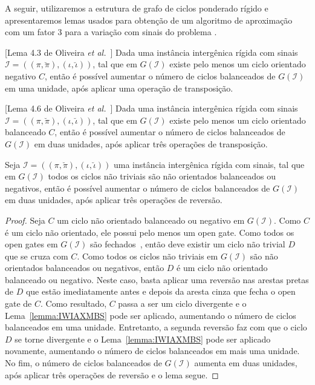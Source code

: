 A seguir, utilizaremos a estrutura de grafo de ciclos ponderado rígido e apresentaremos lemas usados para obtenção de um algoritmo de aproximação com um fator $3$ para a variação com sinais do problema \SbIRTI{}.

\begin{lemma}\label{lemma:CPUOKZAL}[Lema 4.3 de Oliveira \textit{et al.}~\cite{2021a-oliveira-etal}]
Dada uma instância intergênica rígida com sinais $\mathcal{I}=((\pi,\breve\pi),(\iota,\breve\iota))$, tal que em $G(\mathcal{I})$ existe pelo menos um ciclo orientado negativo $C$, então é possível aumentar o número de ciclos balanceados de $G(\mathcal{I})$ em uma unidade, após aplicar uma operação de transposição.
\end{lemma}

\begin{lemma}\label{lemma:PWBLLVMW}[Lema 4.6 de Oliveira \textit{et al.}~\cite{2021a-oliveira-etal}]
Dada uma instância intergênica rígida com sinais $\mathcal{I}=((\pi,\breve\pi),(\iota,\breve\iota))$, tal que em $G(\mathcal{I})$ existe pelo menos um ciclo orientado balanceado $C$, então é possível aumentar o número de ciclos balanceados de $G(\mathcal{I})$ em duas unidades, após aplicar três operações de transposição.
\end{lemma}

\begin{lemma}\label{lemma:JULWGGYC}
Seja $\mathcal{I} = ((\pi,\breve\pi),(\iota,\breve\iota))$ uma instância intergênica rígida com sinais, tal que em $G(\mathcal{I})$ todos os ciclos não triviais são não orientados balanceados ou negativos, então é possível aumentar o número de ciclos balanceados de $G(\mathcal{I})$ em duas unidades, após aplicar três operações de reversão.
\end{lemma}
\begin{proof}
Seja $C$ um ciclo não orientado balanceado ou negativo em $G(\mathcal{I})$. Como $C$ é um ciclo não orientado, ele possui pelo menos um open gate. Como todos os open gates em $G(\mathcal{I})$ são fechados~\cite{1996-bafna-pevzner}, então deve existir um ciclo não trivial $D$ que se cruza com $C$. Como todos os ciclos não triviais em $G(\mathcal{I})$ são não orientados balanceados ou negativos, então $D$ é um ciclo não orientado balanceado ou negativo. Neste caso, basta aplicar uma reversão nas arestas pretas de $D$ que estão imediatamente antes e depois da aresta cinza que fecha o open gate de $C$. Como resultado, $C$ passa a ser um ciclo divergente e o Lema~\ref{lemma:IWIAXMBS} pode ser aplicado, aumentando o número de ciclos balanceados em uma unidade. Entretanto, a segunda reversão faz com que o ciclo $D$ se torne divergente e o Lema~\ref{lemma:IWIAXMBS} pode ser aplicado novamente, aumentando o número de ciclos balanceados em mais uma unidade. No fim, o número de ciclos balanceados de $G(\mathcal{I})$ aumenta em duas unidades, após aplicar três operações de reversão e o lema segue.
\end{proof}

